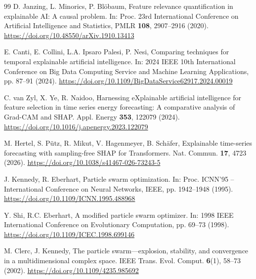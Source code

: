 \documentclass[pdftex,sn-mathphys-num]{sn-jnl}
\begin{document}
\begin{thebibliography}{99}
 D. Janzing, L. Minorics, P. Bl{\"o}baum, Feature relevance quantification in explainable AI: A causal problem. In: Proc. 23rd International Conference on Artificial Intelligence and Statistics, PMLR \textbf{108}, 2907--2916 (2020). \url{https://doi.org/10.48550/arXiv.1910.13413}

 E. Canti, E. Collini, L.A. Ipsaro Palesi, P. Nesi, Comparing techniques for temporal explainable artificial intelligence. In: 2024 IEEE 10th International Conference on Big Data Computing Service and Machine Learning Applications, pp. 87--91 (2024). \url{https://doi.org/10.1109/BigDataService62917.2024.00019}

 C. van Zyl, X. Ye, R. Naidoo, Harnessing eXplainable artificial intelligence for feature selection in time series energy forecasting: A comparative analysis of Grad-CAM and SHAP. Appl. Energy \textbf{353}, 122079 (2024). \url{https://doi.org/10.1016/j.apenergy.2023.122079}

 M. Hertel, S. P{\"u}tz, R. Mikut, V. Hagenmeyer, B. Sch{\"a}fer, Explainable time-series forecasting with sampling-free SHAP for Transformers. Nat. Commun. \textbf{17}, 4723 (2026). \url{https://doi.org/10.1038/s41467-026-73243-5}

 J. Kennedy, R. Eberhart, Particle swarm optimization. In: Proc. ICNN'95 -- International Conference on Neural Networks, IEEE, pp. 1942--1948 (1995). \url{https://doi.org/10.1109/ICNN.1995.488968}

 Y. Shi, R.C. Eberhart, A modified particle swarm optimizer. In: 1998 IEEE International Conference on Evolutionary Computation, pp. 69--73 (1998). \url{https://doi.org/10.1109/ICEC.1998.699146}

 M. Clerc, J. Kennedy, The particle swarm---explosion, stability, and convergence in a multidimensional complex space. IEEE Trans. Evol. Comput. \textbf{6}(1), 58--73 (2002). \url{https://doi.org/10.1109/4235.985692}


\end{thebibliography}
\end{document}
